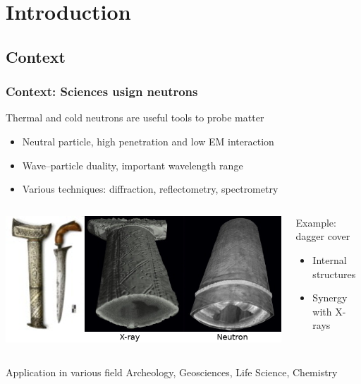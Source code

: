 
\section{Introduction}
\subsection{Context}
\begin{frame}
  \frametitle{Context: Sciences usign neutrons}
  Thermal and cold neutrons are useful tools to probe matter
  \begin{itemize}
    \item Neutral particle, high penetration and low EM interaction
    \item Wave–particle duality, important wavelength range
    \item Various techniques: diffraction, reflectometry, spectrometry
  \end{itemize}
  \begin{columns}
    \begin{column}{0.65\textwidth}
      \includegraphics[width=\textwidth]{01_Neutron/fig/fig000_Dague2.png}
    \end{column}
    \begin{column}{0.3\textwidth}
      \begin{block}{Example: dagger cover}
        \begin{itemize}
          \item Internal structures
          \item Synergy with X-rays
        \end{itemize}

      \end{block}
    \end{column}
  \end{columns}
  \begin{block}{Application in various field}
    Archeology, Geosciences, Life Science, Chemistry
  \end{block}
\end{frame}

